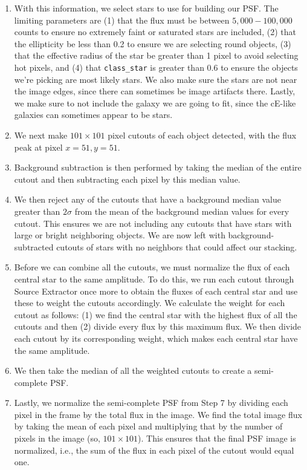 \documentclass[iop,apj]{emulateapj}
\begin{document}
\begin{description}
{\begin{enumerate}
\item With this information, we select stars to use for building our PSF. The limiting parameters are (1) that the flux must be between $5,000-100,000$ counts to ensure no extremely faint or saturated stars are included, (2) that the ellipticity be less than 0.2 to ensure we are selecting round objects, (3) that the effective radius of the star be greater than 1 pixel to avoid selecting hot pixels, and (4) that \texttt{class\_star} is greater than 0.6 to ensure the objects we're picking are most likely stars. We also make sure the stars are not near the image edges, since there can sometimes be image artifacts there. Lastly, we make sure to not include the galaxy we are going to fit, since the cE-like galaxies can sometimes appear to be stars.

\item We next make $101\times101$ pixel cutouts of each object detected, with the flux peak at pixel $x=51,y=51$. 

\item Background subtraction is then performed by taking the median of the entire cutout and then subtracting each pixel by this median value.

\item We then reject any of the cutouts that have a background median value greater than $2\sigma$ from the mean of the background median values for every cutout. This ensures we are not including any cutouts that have stars with large or bright neighboring objects. We are now left with background-subtracted cutouts of stars with no neighbors that could affect our stacking. 

\item Before we can combine all the cutouts, we must normalize the flux of each central star to the same amplitude. To do this, we run each cutout through Source Extractor once more to obtain the fluxes of each central star and use these to weight the cutouts accordingly. We calculate the weight for each cutout as follows: (1) we find the central star with the highest flux of all the cutouts and then (2) divide every flux by this maximum flux. We then divide each cutout by its corresponding weight, which makes each central star have the same amplitude.

\item We then take the median of all the weighted cutouts to create a semi-complete PSF.

\item Lastly, we normalize the semi-complete PSF from Step 7 by dividing each pixel in the frame by the total flux in the image. We find the total image flux by taking the mean of each pixel and multiplying that by the number of pixels in the image (so, $101\times101$). This ensures that the final PSF image is normalized, i.e., the sum of the flux in each pixel of the cutout would equal one.    


\end{enumerate}}
\end{description}
\end{document}
